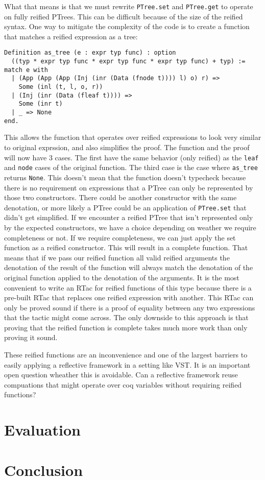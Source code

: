 \documentclass{puthesis}
\begin{document}
What that means is that we must rewrite \lstinline|PTree.set| and \lstinline|PTree.get|
to operate on fully reified PTrees. This can be difficult because of the size 
of the reified syntax. One way to mitigate the complexity of the code is to 
create a function that matches a reified expression as a tree:

\begin{lstlisting}
Definition as_tree (e : expr typ func) : option
  ((typ * expr typ func * expr typ func * expr typ func) + typ) := 
match e with
  | (App (App (App (Inj (inr (Data (fnode t)))) l) o) r) =>
    Some (inl (t, l, o, r))
  | (Inj (inr (Data (fleaf t)))) =>
    Some (inr t)
  | _ => None
end.
\end{lstlisting}

This allows the function that operates over reified expressions to look very
similar to original exprssion, and also simplifies the proof. The function
and the proof will now have 3 cases. The first have the same behavior (only reified)
as the \lstinline|leaf| and \lstinline|node| cases of the original function. The third
case is the case where \lstinline|as_tree| returns \lstinline|None|. This doesn't
mean that the function doesn't typecheck because there is no requirement on 
expressions that a PTree can only be represented by those two constructors. There
could be another constructor with the same denotation, or more likely a PTree
could be an application of \lstinline|PTree.set| that didn't get simplified.
If we encounter a reified PTree that isn't represented
only by the expected constructors, we have a choice depending on
weather we require completeness or not. If we require completeness,
we can just apply the set function as a reified constructor. This
will result in a complete function. That means that if we
pass our reified function all valid reified arguments
the denotation of the result of the function will always
match the denotation of the original function applied
to the denotation of the arguments. It is the most convenient
to write an RTac for reified functions of this type because
there is a pre-built RTac that replaces one reified expression
with another. This RTac can only be proved sound if there is a proof
of equality between any two expressions that the tactic might come
across. The only downside to this approach is that proving that the
reified function is complete takes much more work than only proving it
sound. 

These reified functions are an inconvenience and one of the largest
barriers to easily applying a reflective framework in a setting like
VST. It is an important open question wheather this is avoidable. Can
a reflective framework reuse compuations that might operate
over coq variables without requiring reified functions? 

\chapter{Evaluation}

\chapter{Conclusion}



\end{document}

